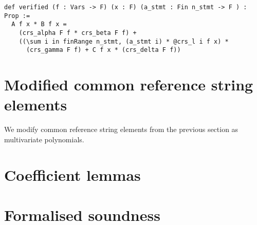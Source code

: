 \documentclass{article}
\theoremstyle{definition}
\theoremstyle{remark}
\begin{document}
\begin{lstlisting}
def verified (f : Vars -> F) (x : F) (a_stmt : Fin n_stmt -> F ) : Prop :=
  A f x * B f x =
    (crs_alpha F f * crs_beta F f) +
    ((\sum i in finRange n_stmt, (a_stmt i) * @crs_l i f x) *
      (crs_gamma F f) + C f x * (crs_delta F f))
\end{lstlisting}

\section{Modified common reference string elements}

We modify common reference string elements from the previous section as multivariate polynomials.

\section{Coefficient lemmas}

\section{Formalised soundness}



\end{document}
